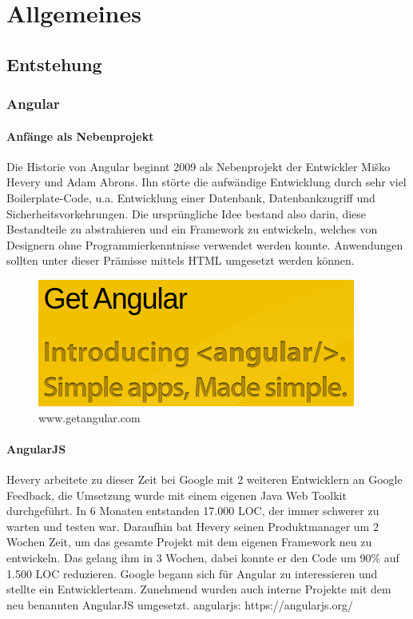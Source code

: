 \chapter{Allgemeines}

\section{Entstehung}

\subsection{Angular}
\subsubsection{Anfänge als Nebenprojekt}
Die Historie von Angular beginnt 2009 als Nebenprojekt der Entwickler Miško Hevery und Adam Abrons. Ihn störte die aufwändige Entwicklung durch sehr viel Boilerplate-Code, u.a. Entwicklung einer Datenbank, Datenbankzugriff und Sicherheitsvorkehrungen.
Die ursprüngliche Idee bestand also darin, diese Bestandteile zu abstrahieren und ein Framework zu entwickeln, welches von Designern ohne Programmierkenntnisse verwendet werden konnte. Anwendungen sollten unter dieser Prämisse mittels HTML umgesetzt werden können.
\begin{figure}
    \centering
    \includegraphics[scale=0.8]{Grafiken/getangular.png}
    \caption{www.getangular.com}
    \label{fig:getangular}
\end{figure}

\subsubsection{AngularJS}
Hevery arbeitete zu dieser Zeit bei Google mit 2 weiteren Entwicklern an Google Feedback, die Umsetzung wurde mit einem eigenen Java Web Toolkit durchgeführt. In 6 Monaten entstanden 17.000 LOC, der immer schwerer zu warten und testen war. Daraufhin bat Hevery seinen Produktmanager um 2 Wochen Zeit, um das gesamte Projekt mit dem eigenen Framework neu zu entwickeln. Das gelang ihm in 3 Wochen, dabei konnte er den Code um 90\% auf 1.500 LOC reduzieren. Google begann sich für Angular zu interessieren und stellte ein Entwicklerteam. Zunehmend wurden auch interne Projekte mit dem neu benannten AngularJS umgesetzt.\cite{yt_ngConf2014} angularjs: https://angularjs.org/

